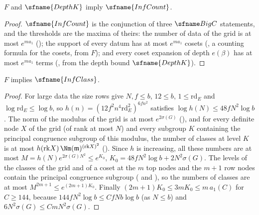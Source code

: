 \begin{theorem}\label{pf:fit:sumcount}
$F$ and $\sfname{DepthK}$ imply $\sfname{InfCount}$.
\end{theorem}

\begin{proof}
$\sfname{InfCount}$ is the conjunction of three $\fitBigC$ statements, and the thresholds are the maxima of theirs: the number of
data of the grid is at most $e^{ma_1}$ (); the support of every datum has at
most $e^{ma_1}$ cosets (, a counting formula for the cosets, from $F$); and
every coset expansion of depth $e(\beta)$ has at most $e^{ma_1}$ terms
(, from the depth bound $\sfname{DepthK}$).
\end{proof}

\begin{theorem}\label{pf:fit:classcount}
$F$ implies $\sfname{InfClass}$.
\end{theorem}

\begin{proof}
For large data the size rows give $N,f\le b$, $12\le b$, $1\le\mathrm{rd}_E$ and $\log\mathrm{rd}_E\le\log b$, so
$h(n)=(12f^2n^4\mathrm{rd}_E^2)^{6fn^2}$ satisfies $\log h(N)\le48fN^2\log b$. The norm of the modulus of the grid is at most
$e^{2\sigma(G)}$ (), and for every definite node $X$ of the
grid (of rank at most $N$) and every subgroup $K$ containing the principal congruence subgroup of this modulus, the number of
classes at level $K$ is at most $h(\mathrm{rk}X)\,\Nm(\mathfrak m)^{(\mathrm{rk}X)^2}$
(). Since $h$ is increasing, all these numbers are at most
$M=h(N)e^{2\sigma(G)N^2}\le e^{K_0}$, $K_0=48fN^2\log b+2N^2\sigma(G)$. The levels of the classes of the grid and of a coset at
the $m$ top nodes and the $m+1$ row nodes contain the principal congruence subgroup
( and ),
so the numbers of classes are at most $M^{2m+1}\le e^{(2m+1)K_0}$. Finally $(2m+1)K_0\le3mK_0\le m\,a_1(C)$ for $C\ge144$, because
$144fN^2\log b\le Cf N b\log b$ (as $N\le b$) and $6N^2\sigma(G)\le CmN^2\sigma(G)$.
\end{proof}

